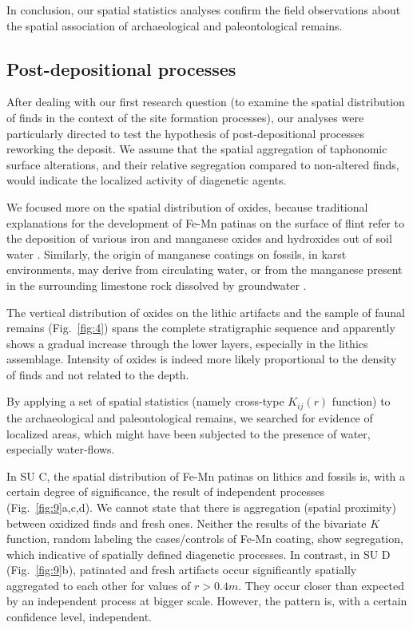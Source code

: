 \documentclass[review,authoryear]{elsarticle} %
\begin{document}
In conclusion, our spatial statistics analyses confirm the field observations about the spatial association of archaeological and paleontological remains.

\subsection{Post-depositional processes}

After dealing with our first research question (to examine the spatial distribution of finds in the context of the site formation processes), our analyses were particularly directed to test the hypothesis of post-depositional processes reworking the deposit. We assume that the spatial aggregation of taphonomic surface alterations, and their relative segregation compared to non-altered finds, would indicate the localized activity of diagenetic agents.

We focused more on the spatial distribution of oxides, because traditional explanations for the development of Fe-Mn patinas on the surface of flint refer to the deposition of various iron and manganese oxides and hydroxides out of soil water \citep{Stapert1976}. Similarly, the origin of manganese coatings on fossils, in karst environments, may derive from circulating water, or from the manganese present in the surrounding limestone rock dissolved by groundwater \citep{Hill1982}.

The vertical distribution of oxides on the lithic artifacts and the sample of faunal remains (Fig.~\ref{fig:4}) spans the complete stratigraphic sequence and apparently shows a gradual increase through the lower layers, especially in the lithics assemblage. Intensity of oxides is indeed more likely proportional to the density of finds and not related to the depth.

By applying a set of spatial statistics (namely cross-type $K_{ij}(r)$ function) to the archaeological and paleontological remains, we searched for evidence of localized areas, which might have been subjected to the presence of water, especially water-flows.

In SU C, the spatial distribution of Fe-Mn patinas on lithics and fossils is, with a certain degree of significance, the result of independent processes (Fig.~\ref{fig:9}a,c,d). We cannot state that there is aggregation (spatial proximity) between oxidized finds and fresh ones. Neither the results of the bivariate $K$ function, random labeling the cases/controls of Fe-Mn coating, show segregation, which indicative of spatially defined diagenetic processes. In contrast, in SU D (Fig.~\ref{fig:9}b), patinated and fresh artifacts occur significantly spatially aggregated to each other for values of $r>0.4 m$. They occur closer than expected by an independent process at bigger scale. However, the pattern is, with a certain confidence level, independent.
\end{document}
